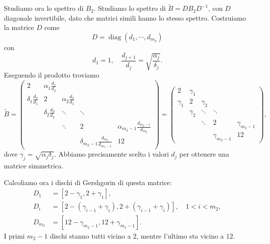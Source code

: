 \documentclass[a4paper]{article}
\begin{document}
\begin{snippetsolution}{}
\begin{enumerate}
            Studiamo ora lo spettro di \(B_2\).
            Studiamo lo spettro di \(\tilde B = DB_2D^{-1}\), con \(D\) diagonale invertibile,
            dato che matrici simili hanno lo stesso spettro. Costruiamo la matrice \(D\) come
            \[
                D = \operatorname{diag}(d_1, \cdots, d_{m_2})
            \]
            con
            \[
                d_1 = 1, \quad
                \frac{d_{j+1}}{d_j}
                =
                \sqrt{\frac{\alpha_j}{\delta_j}}.
            \]
            Eseguendo il prodotto troviamo
            \[
                \tilde B =
                \begin{pmatrix}
                    2 & \alpha_1 \frac{d_1}{d_2} & & & \\
                    \delta_1 \frac{d_2}{d_1} & 2 & \alpha_2 \frac{d_2}{d_3} & & \\
                    & \delta_2 \frac{d_3}{d_2} & \ddots & \ddots & \\
                    & & \ddots & 2 & \alpha_{m_2-1} \frac{d_{m_2-1}}{d_{m_2}} \\
                    & & & \delta_{m_2-1} \frac{d_{m_2}}{d_{m_2-1}} & 12
                \end{pmatrix}
                =
                \begin{pmatrix}
                    2 & \gamma_1 & & & \\
                    \gamma_1 & 2 & \gamma_2 & & \\
                    & \gamma_2 & \ddots & \ddots & \\
                    & & \ddots & 2 & \gamma_{m_2-1} \\
                    & & & \gamma_{m_2-1} & 12
                \end{pmatrix},
            \]
            dove \(\gamma_j = \sqrt{\alpha_j\delta_j}\).
            Abbiamo precisamente scelto i valori \(d_j\) per ottenere una matrice simmetrica.

            Calcoliamo ora i dischi di Gershgorin di questa matrice:
            \begin{align*}
                D_1 &= \left[2 - \gamma_1, 2 + \gamma_1\right], \\
                D_i &= \left[2 - (\gamma_{i-1} + \gamma_i), 2 + (\gamma_{i-1} + \gamma_i)\right],
                \quad 1 < i < m_2, \\
                D_{m_2} &= \left[12 - \gamma_{m_2 - 1}, 12 + \gamma_{m_2 - 1}\right].
            \end{align*}
            I primi \(m_2-1\) dischi stanno tutti vicino a \(2\), mentre l'ultimo sta vicino a \(12\).


\end{enumerate}
\end{snippetsolution}
\end{document}
